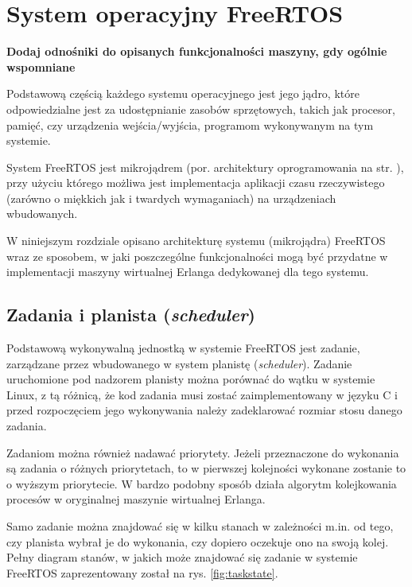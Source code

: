 \chapter{System operacyjny FreeRTOS}
\label{cha:freertos}

\textbf{Dodaj odnośniki do opisanych funkcjonalności maszyny, gdy ogólnie wspomniane}

Podstawową częścią każdego systemu operacyjnego jest jego jądro, które odpowiedzialne jest za udostępnianie zasobów sprzętowych, takich jak procesor, pamięć, czy urządzenia wejścia/wyjścia, programom wykonywanym na tym systemie.

System FreeRTOS jest mikrojądrem (por. architektury oprogramowania na str. \pageref{ref:architektury}), przy użyciu którego możliwa jest implementacja aplikacji czasu rzeczywistego (zarówno o miękkich jak i twardych wymaganiach) na urządzeniach wbudowanych.

W niniejszym rozdziale opisano architekturę systemu (mikrojądra) FreeRTOS wraz ze sposobem, w jaki
poszczególne funkcjonalności mogą być przydatne w implementacji maszyny wirtualnej Erlanga dedykowanej dla tego systemu.

\section{Zadania i planista (\emph{scheduler})}
\label{sec:rtosScheduler}

Podstawową wykonywalną jednostką w systemie FreeRTOS jest zadanie, zarządzane przez wbudowanego w system planistę (\emph{scheduler}).
Zadanie uruchomione pod nadzorem planisty można porównać do wątku w systemie Linux, z tą różnicą, że kod zadania musi zostać zaimplementowany w języku C i przed rozpoczęciem jego wykonywania należy zadeklarować rozmiar stosu danego zadania.

Zadaniom można również nadawać priorytety. Jeżeli przeznaczone do wykonania są zadania o różnych priorytetach, to w pierwszej kolejności wykonane zostanie to o wyższym priorytecie. W bardzo podobny sposób działa algorytm kolejkowania procesów w oryginalnej maszynie wirtualnej Erlanga.

Samo zadanie można znajdować się w kilku stanach w zależności m.in. od tego, czy planista wybrał je do wykonania, czy dopiero oczekuje ono na swoją kolej. Pełny diagram stanów, w jakich może znajdować się zadanie w systemie FreeRTOS zaprezentowany został na rys. \ref{fig:taskstate}.

